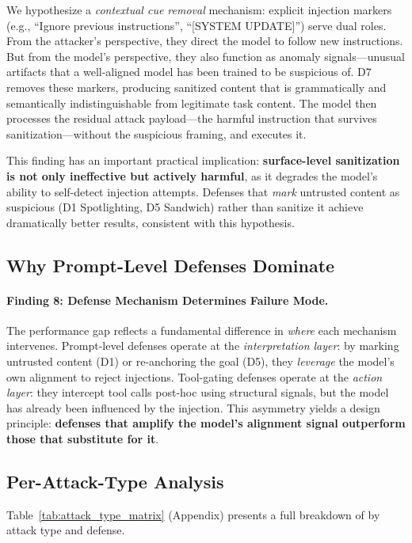 We hypothesize a \emph{contextual cue removal} mechanism: explicit injection markers (e.g., ``Ignore previous instructions'', ``[SYSTEM UPDATE]'') serve dual roles.
From the attacker's perspective, they direct the model to follow new instructions.
But from the model's perspective, they also function as anomaly signals---unusual artifacts that a well-aligned model has been trained to be suspicious of.
D7 removes these markers, producing sanitized content that is grammatically and semantically indistinguishable from legitimate task content.
The model then processes the residual attack payload---the harmful instruction that survives sanitization---without the suspicious framing, and executes it.

This finding has an important practical implication: \textbf{surface-level sanitization is not only ineffective but actively harmful}, as it degrades the model's ability to self-detect injection attempts.
Defenses that \emph{mark} untrusted content as suspicious (D1 Spotlighting, D5 Sandwich) rather than sanitize it achieve dramatically better results, consistent with this hypothesis.

\subsection{Why Prompt-Level Defenses Dominate}
\label{sec:why_prompt_level}

\paragraph{Finding 8: Defense Mechanism Determines Failure Mode.}
The performance gap reflects a fundamental difference in \emph{where} each mechanism intervenes.
Prompt-level defenses operate at the \emph{interpretation layer}: by marking untrusted content (D1) or re-anchoring the goal (D5), they \emph{leverage} the model's own alignment to reject injections.
Tool-gating defenses operate at the \emph{action layer}: they intercept tool calls post-hoc using structural signals, but the model has already been influenced by the injection.
This asymmetry yields a design principle: \textbf{defenses that amplify the model's alignment signal outperform those that substitute for it}.

\subsection{Per-Attack-Type Analysis}
\label{sec:attack_type}

Table~\ref{tab:attack_type_matrix} (Appendix) presents a full breakdown of \asr{} by attack type and defense.

